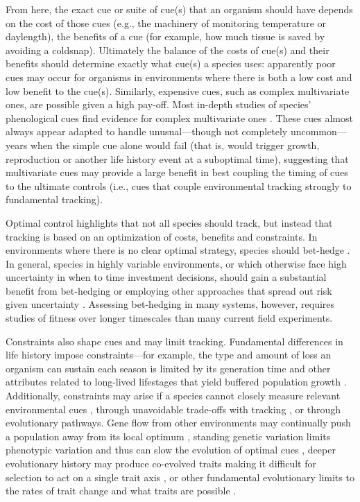 \documentclass[11pt,letterpaper]{article}
\begin{document}
From here, the exact cue or suite of cue(s) that an organism should have depends on the cost of those cues (e.g., the machinery of monitoring temperature or daylength), the benefits of a cue (for example, how much tissue is saved by avoiding a coldsnap). Ultimately the balance of the costs of cue(s) and their benefits should determine exactly what cue(s) a species uses: apparently poor cues may occur for organisms in environments where there is both a low cost and low benefit to the cue(s). Similarly, expensive cues, such as complex multivariate ones, are possible given a high pay-off. Most in-depth studies of species' phenological cues find evidence for complex multivariate ones \citep{chuinearees}. These cues almost always appear adapted to handle unusual---though not completely uncommon---years when the simple cue alone would fail (that is, would trigger growth, reproduction or another life history event at a suboptimal time), suggesting that multivariate cues may provide a large benefit in best coupling the timing of cues to the ultimate controls (i.e., cues that couple environmental tracking strongly to fundamental tracking). 

Optimal control highlights that not all species should track, but instead that tracking is based on an optimization of costs, benefits and constraints. In environments where there is no clear optimal strategy, species should bet-hedge \citep{decasas2015}. In general, species in highly variable environments, or which otherwise face high uncertainty in when to time investment decisions, should gain a substantial benefit from bet-hedging or employing other approaches that spread out risk given uncertainty \citep{Venable:2007os,donald2013}. Assessing bet-hedging in many systems, however, requires studies of fitness over longer timescales than many current field experiments. %

Constraints also shape cues and may limit tracking. Fundamental differences in life history impose constraints---for example, the type and amount of loss an organism can sustain each season is limited by its generation time and other attributes related to long-lived lifestages that yield buffered population growth \citep{Chesson:1997dz}. Additionally, constraints may arise if a species cannot closely measure relevant environmental cues \citep{arnold1992,Singer:2010eb}, through unavoidable trade-offs with tracking \citep{Singer:2010eb,Johansson2012}, or through evolutionary pathways. Gene flow from other environments may continually push a population away from its local optimum \citep{lenormand2002}, standing genetic variation limits phenotypic variation and thus can slow the evolution of optimal cues \citep{Franks:2007wd,ghalambor2015}, deeper evolutionary history may produce co-evolved traits making it difficult for selection to act on a single trait axis \citep{Ackerly:2009ly}, or other fundamental evolutionary limits to the rates of trait change and what traits are possible \citep{spandrels}. 
\end{document}
